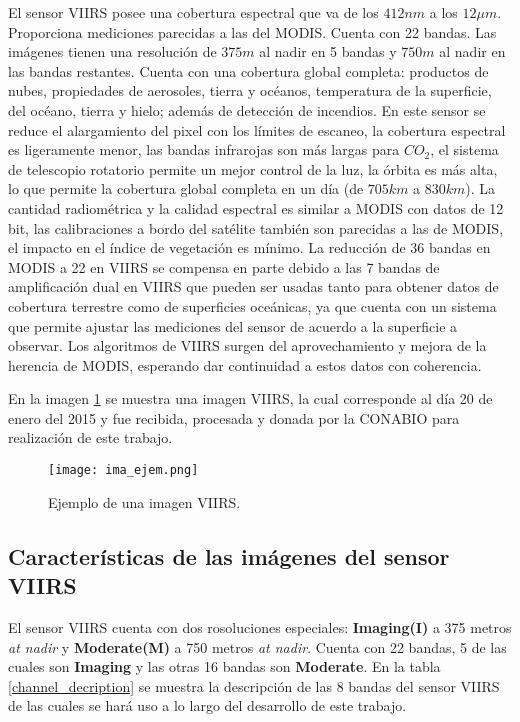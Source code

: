 El sensor VIIRS posee una cobertura espectral que va de los $412nm$ a los $12 \mu m$. Proporciona mediciones parecidas a las del MODIS. Cuenta con 22 bandas. Las imágenes tienen una resolución de $375m$ al nadir en 5 bandas y $750m$ al nadir en las bandas restantes. Cuenta con una cobertura global completa:  productos de nubes, propiedades de aerosoles, tierra y océanos, temperatura de la superficie, del océano, tierra y hielo; además de detección de incendios. En este sensor se reduce el alargamiento del pixel con los límites de escaneo, la cobertura espectral es ligeramente menor, las bandas infrarojas son más largas para $CO_{2}$, el sistema de telescopio rotatorio permite un mejor control de la luz, la órbita es más alta, lo que permite la cobertura global completa en un día (de $705 km$ a $830km$). La cantidad radiométrica y la calidad espectral es similar a MODIS con datos de 12 bit, las calibraciones a bordo del satélite también son parecidas a las de MODIS, el impacto en el índice de vegetación es mínimo. La reducción de 36 bandas en MODIS a 22 en VIIRS se compensa en parte debido a las 7 bandas de amplificación dual en VIIRS que pueden ser usadas tanto para obtener datos de cobertura terrestre  como de superficies oceánicas, ya que cuenta con un sistema que permite ajustar las mediciones del sensor de acuerdo a la superficie a observar. Los algoritmos de VIIRS surgen del aprovechamiento y mejora de la herencia de MODIS, esperando dar continuidad a estos datos con coherencia. 

En la imagen \ref{viirs_image} se muestra una imagen VIIRS, la cual corresponde al día 20 de enero del 2015 y fue recibida, procesada y donada por la CONABIO para realización de este trabajo. 

\begin{figure}

\centering
\texttt{[image: ima\_ejem.png]}
\caption{Ejemplo de una imagen VIIRS.}
\label{viirs_image}

\end{figure}


\subsection{Características de las imágenes del sensor VIIRS}

El sensor VIIRS cuenta con dos rosoluciones especiales: \textbf{Imaging(I)} a 375 metros \textit{at nadir} y \textbf{Moderate(M)} a 750 metros \textit{at nadir}. Cuenta con 22 bandas, 5 de las cuales son \textbf{Imaging} y las otras 16 bandas son \textbf{Moderate}.  En la tabla \ref{channel_decription} se muestra la descripción de las 8 bandas del sensor VIIRS de las cuales se hará  uso a lo largo del desarrollo de este trabajo. 

